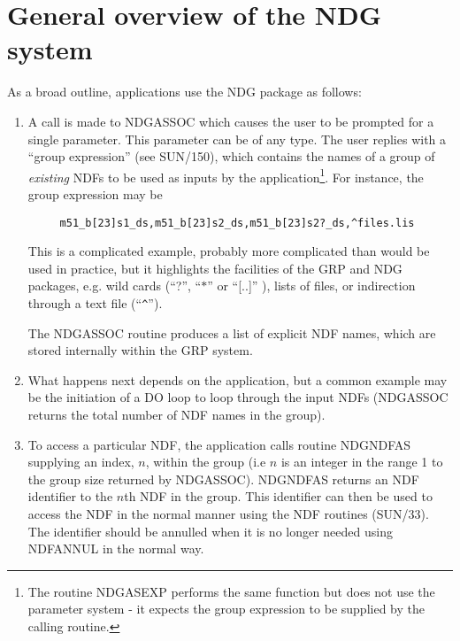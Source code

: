 \documentclass[twoside,11pt]{article}
\newcommand{\htmlref}[2]{#1}
\newcommand{\xref}[3]{#1}
\renewcommand{\_}{\texttt{\symbol{95}}}
\begin{document}
\section {General overview of the NDG\_ system}
As a broad outline, applications use the NDG\_ package as follows:

\begin{enumerate}

\item A call is made to \htmlref{NDG\_ASSOC}{NDG\_ASSOC} which causes the user 
to be prompted for a single parameter. This parameter can be of any type.
The user replies with a ``group expression'' (see
\xref{SUN/150}{sun150}{}), which contains the names of a group of {\em
existing} NDFs to be used as inputs by the application\footnote{The routine
\htmlref{NDG\_ASEXP}{NDG\_ASEXP} performs the same function but does not
use the parameter system - it expects the group expression to be supplied by 
the calling routine.}. For instance, the group expression may be

\begin{verbatim}
     m51_b[23]s1_ds,m51_b[23]s2_ds,m51_b[23]s2?_ds,^files.lis
\end{verbatim}

This is a complicated example, probably more complicated than would be
used in practice, but it highlights the facilities of the GRP and NDG
packages, e.g. wild cards (``?'', ``$*$'' or ``[..]'' ), lists of files,
or indirection through a text file (``\verb+^+'').

The \htmlref{NDG\_ASSOC}{NDG\_ASSOC} routine produces a list of explicit NDF names, which are stored
internally within the GRP system. 

\item What happens next depends on the application, but a common example may be
the initiation of a DO loop to loop through the input NDFs (NDG\_ASSOC returns
the total number of NDF names in the group). 

\item To access a particular NDF, the application calls routine \htmlref{NDG\_NDFAS}{NDG\_NDFAS}
supplying an index, $n$, within the group (i.e $n$ is an integer in the range 1
to the group size returned by NDG\_ASSOC). NDG\_NDFAS returns an NDF identifier
to the $n$th NDF in the group. This identifier can then be used to access the
NDF in the normal manner using the NDF\_ routines (\xref{SUN/33}{sun33}{}). The identifier
should be annulled when it is no longer needed using \xref{NDF\_ANNUL}{sun33}{NDF\_ANNUL} in the
normal way.


\end{enumerate}
\end{document}

